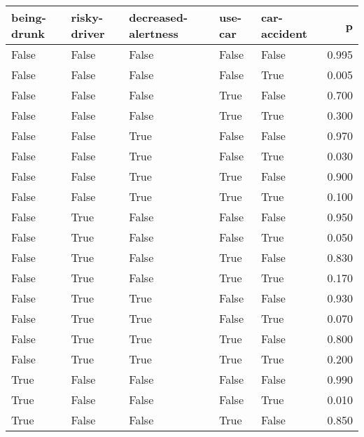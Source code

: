 \begin{tabular}{lllllr}
\toprule
 being-drunk &  risky-driver &  decreased-alertness &  use-car &  car-accident &     p \\
\midrule
       False &         False &                False &    False &         False & 0.995 \\
       False &         False &                False &    False &          True & 0.005 \\
       False &         False &                False &     True &         False & 0.700 \\
       False &         False &                False &     True &          True & 0.300 \\
       False &         False &                 True &    False &         False & 0.970 \\
       False &         False &                 True &    False &          True & 0.030 \\
       False &         False &                 True &     True &         False & 0.900 \\
       False &         False &                 True &     True &          True & 0.100 \\
       False &          True &                False &    False &         False & 0.950 \\
       False &          True &                False &    False &          True & 0.050 \\
       False &          True &                False &     True &         False & 0.830 \\
       False &          True &                False &     True &          True & 0.170 \\
       False &          True &                 True &    False &         False & 0.930 \\
       False &          True &                 True &    False &          True & 0.070 \\
       False &          True &                 True &     True &         False & 0.800 \\
       False &          True &                 True &     True &          True & 0.200 \\
        True &         False &                False &    False &         False & 0.990 \\
        True &         False &                False &    False &          True & 0.010 \\
        True &         False &                False &     True &         False & 0.850 \\

\end{tabular}
